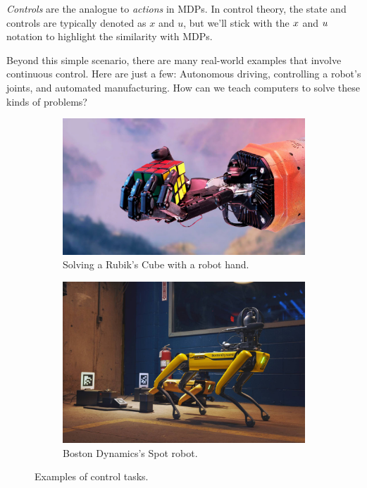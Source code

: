 \documentclass[../main/main]{subfiles}
\begin{document}
\emph{Controls} are the analogue to \emph{actions} in MDPs. In control theory, the state and controls are typically denoted as
$x$ and $u$, but we'll stick with the $x$ and $u$ notation to highlight the
similarity with MDPs.

Beyond this simple scenario, there are many real-world examples that involve continuous control. Here are just a few:
Autonomous driving, controlling a robot's joints, and automated manufacturing.
How can we teach computers to solve these kinds of problems?

\begin{figure}[h]
    \centering
    \begin{subfigure}[b]{0.45\textwidth}
        \includegraphics[width=\textwidth]{rubiks_cube.jpg}
        \caption{Solving a Rubik's Cube with a robot hand.}
        \label{fig:rubik\st_cube}
    \end{subfigure}
    \hfill
    \begin{subfigure}[b]{0.45\textwidth}
        \includegraphics[width=\textwidth]{boston_dynamics.jpg}
        \caption{Boston Dynamics's Spot robot.}
        \label{fig:robot_hand}
    \end{subfigure}
    \caption{Examples of control tasks.}
    \label{fig:control_examples}
\end{figure}
\end{document}
